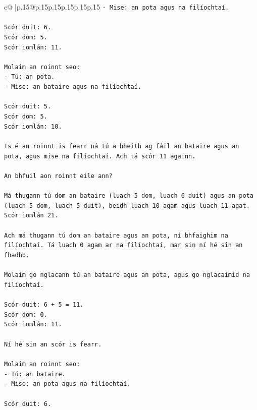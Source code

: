 \documentclass{article}
\begin{document}
{\begin{supertabular}{c@{$\;$}|p{.15\linewidth}@{}p{.15\linewidth}p{.15\linewidth}p{.15\linewidth}p{.15\linewidth}p{.15\linewidth}}
{{{\texttt{{-} Mise: an pota agus na filíochtaí.} \\
\\ 
\texttt{Scór duit: 6.} \\
\texttt{Scór dom: 5.} \\
\texttt{Scór iomlán: 11.} \\
\\ 
\texttt{Molaim an roinnt seo:} \\
\texttt{{-} Tú: an pota.} \\
\texttt{{-} Mise: an bataire agus na filíochtaí.} \\
\\ 
\texttt{Scór duit: 5.} \\
\texttt{Scór dom: 5.} \\
\texttt{Scór iomlán: 10.} \\
\\ 
\texttt{Is é an roinnt is fearr ná tú a bheith ag fáil an bataire agus an pota, agus mise na filíochtaí. Ach tá scór 11 againn.} \\
\\ 
\texttt{An bhfuil aon roinnt eile ann?} \\
\\ 
\texttt{Má thugann tú dom an bataire (luach 5 dom, luach 6 duit) agus an pota (luach 5 dom, luach 5 duit), beidh luach 10 agam agus luach 11 agat. Scór iomlán 21.} \\
\\ 
\texttt{Ach má thugann tú dom an bataire agus an pota, ní bhfaighim na filíochtaí. Tá luach 0 agam ar na filíochtaí, mar sin ní hé sin an fhadhb.} \\
\\ 
\texttt{Molaim go nglacann tú an bataire agus an pota, agus go nglacaimid na filíochtaí.} \\
\\ 
\texttt{Scór duit: 6 + 5 = 11.} \\
\texttt{Scór dom: 0.} \\
\texttt{Scór iomlán: 11.} \\
\\ 
\texttt{Ní hé sin an scór is fearr.} \\
\\ 
\texttt{Molaim an roinnt seo:} \\
\texttt{{-} Tú: an bataire.} \\
\texttt{{-} Mise: an pota agus na filíochtaí.} \\
\\ 
\texttt{Scór duit: 6.} \\
}}}
\end{supertabular}}
\end{document}
